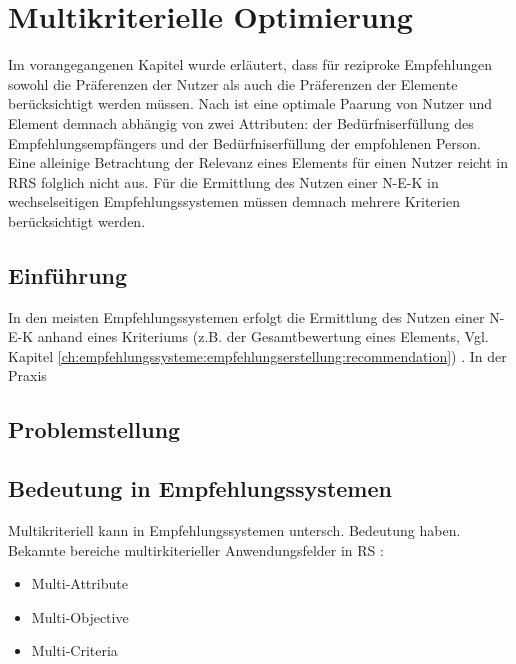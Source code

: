 
\chapter{Multikriterielle Optimierung}
\label{ch:erweiterungen}
Im vorangegangenen Kapitel wurde erläutert, dass für reziproke Empfehlungen sowohl die Präferenzen der Nutzer als auch die Präferenzen der Elemente berücksichtigt werden müssen.
Nach \textcite[S. 36]{li:inproceedings} ist eine optimale Paarung von Nutzer und Element demnach abhängig von zwei Attributen: der Bedürfniserfüllung des Empfehlungsempfängers und der Bedürfniserfüllung der empfohlenen Person.
Eine alleinige Betrachtung der Relevanz eines Elements für einen Nutzer reicht in \ac{RRS} folglich nicht aus.
Für die Ermittlung des Nutzen einer \ac{N-E-K} in wechselseitigen Empfehlungssystemen müssen demnach mehrere Kriterien berücksichtigt werden.

\section{Einführung}
\label{ch:erweiterungen:einführung}
In den meisten Empfehlungssystemen erfolgt die Ermittlung des Nutzen einer \ac{N-E-K} anhand eines Kriteriums (z.B. der Gesamtbewertung eines Elements, Vgl. Kapitel \ref{ch:empfehlungssysteme:empfehlungserstellung:recommendation}) \cite[S. 847]{adomavicius:4:inbook}\cite[S. 745]{adomavicius:inproceedings}\cite[S. 49]{adomavicius:inproceedings:2}\cite[S. 424]{manouselis:article}\cite[S. 65]{lakiotaki:article}.
In der Praxis

\section{Problemstellung}

\section{Bedeutung in Empfehlungssystemen}
Multikriteriell kann in Empfehlungssystemen untersch. Bedeutung haben. Bekannte bereiche multirkiterieller Anwendungsfelder in RS \cite[S. 849]{adomavicius:4:inbook}:
\begin{itemize}
    \item Multi-Attribute
    \item Multi-Objective
    \item Multi-Criteria
\end{itemize}

